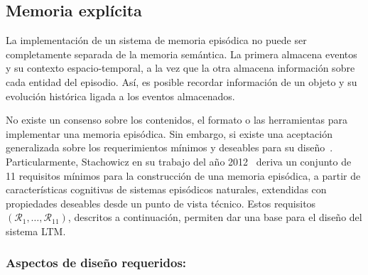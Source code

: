 \subsection{Memoria explícita}\label{sec:ltm_exp}

La implementación de un sistema de memoria episódica no puede ser completamente separada de la memoria semántica. La primera almacena eventos y su contexto espacio-temporal, a la vez que la otra almacena información sobre cada entidad del episodio. Así, es posible recordar información de un objeto y su evolución histórica ligada a los eventos almacenados.

No existe un consenso sobre los contenidos, el formato o las herramientas para implementar una memoria episódica\cite{ltm_in_robocup}. Sin embargo, si existe una aceptación generalizada sobre los requerimientos mínimos y deseables para su diseño~\cite{Vijayakumar2014,Ho2009,Jockel2008}. Particularmente, Stachowicz en su trabajo del año 2012~\cite{Stachowicz2012} deriva un conjunto de 11 requisitos mínimos para la construcción de una memoria episódica, a partir de características cognitivas de sistemas episódicos naturales, extendidas con propiedades deseables desde un punto de vista técnico. Estos requisitos $(\mathcal{R}_{1},\ldots,\mathcal{R}_{11})$, descritos a continuación, permiten dar una base para el diseño del sistema LTM.


\subsubsection{Aspectos de diseño requeridos:}


